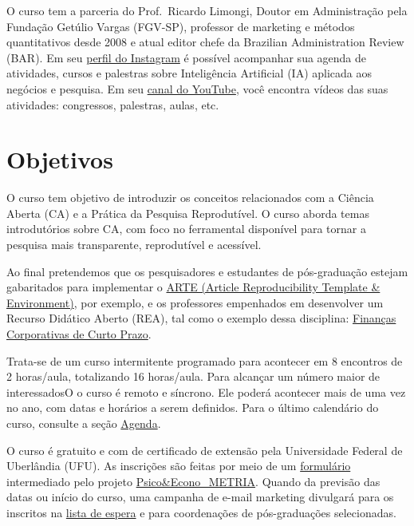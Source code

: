 \documentclass[
  a4paper,
]{book}
\begin{document}
O curso tem a parceria do Prof.~Ricardo Limongi, Doutor em Administração
pela Fundação Getúlio Vargas (FGV-SP), professor de marketing e métodos
quantitativos desde 2008 e atual editor chefe da Brazilian
Administration Review (BAR). Em seu
\href{https://www.instagram.com/limongi/}{perfil do Instagram} é
possível acompanhar sua agenda de atividades, cursos e palestras sobre
Inteligência Artificial (IA) aplicada aos negócios e pesquisa. Em seu
\href{https://www.youtube.com/@ricardolimongi_ia}{canal do YouTube},
você encontra vídeos das suas atividades: congressos, palestras, aulas,
etc.

\section*{Objetivos}\label{sec-about}


O curso tem objetivo de introduzir os conceitos relacionados com a
Ciência Aberta (CA) e a Prática da Pesquisa Reprodutível. O curso aborda
temas introdutórios sobre CA, com foco no ferramental disponível para
tornar a pesquisa mais transparente, reprodutível e acessível.

Ao final pretendemos que os pesquisadores e estudantes de pós-graduação
estejam gabaritados para implementar o
\href{https://phdpablo.github.io/article-template/}{ARTE (Article
Reproducibility Template \& Environment)}, por exemplo, e os professores
empenhados em desenvolver um Recurso Didático Aberto (REA), tal como o
exemplo dessa disciplina: \href{https://fccp.phdpablo.com/}{Finanças
Corporativas de Curto Prazo}.

Trata-se de um curso intermitente programado para acontecer em 8
encontros de 2 horas/aula, totalizando 16 horas/aula. Para alcançar um
número maior de interessadosO o curso é remoto e síncrono. Ele poderá
acontecer mais de uma vez no ano, com datas e horários a serem
definidos. Para o último calendário do curso, consulte a seção
\href{00-schedule.html}{Agenda}.

O curso é gratuito e com de certificado de extensão pela Universidade
Federal de Uberlândia (UFU). As inscrições são feitas por meio de um
\href{https://forms.gle/wRNWAU9Ffyp7o4Vq9}{formulário} intermediado pelo
projeto
\href{https://www.youtube.com/c/PsicoEconoMETRIA}{Psico\&Econo\_METRIA}.
Quando da previsão das datas ou início do curso, uma campanha de e-mail
marketing divulgará para os inscritos na
\href{https://forms.gle/wRNWAU9Ffyp7o4Vq9}{lista de espera} e para
coordenações de pós-graduações selecionadas.
\end{document}
